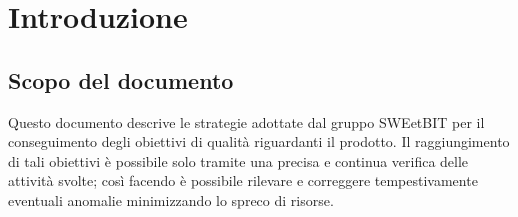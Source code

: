 \section{Introduzione}

\subsection{Scopo del documento}
Questo documento descrive le strategie adottate dal gruppo SWEetBIT per il conseguimento degli obiettivi di qualità riguardanti il prodotto. Il raggiungimento di tali obiettivi è possibile solo tramite una precisa e continua verifica delle attività svolte; così facendo è possibile rilevare e correggere tempestivamente eventuali anomalie minimizzando lo spreco di risorse.
